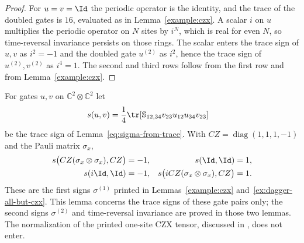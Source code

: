 \begin{proof}\leanok
    For $u=v=\Id$ the periodic operator is the identity, and the trace of the
    doubled gates is $16$, evaluated as in Lemma~\ref{example:czx}. A scalar
    $i$ on $u$ multiplies the periodic operator on $N$ sites by $i^N$, which
    is real for even $N$, so time-reversal invariance persists on those rings.
    The scalar enters the trace sign of $u,v$ as $i^2=-1$ and the doubled
    gate $u^{(2)}$ as $i^2$, hence the trace sign of $u^{(2)},v^{(2)}$ as
    $i^4=1$. The second and third rows follow from the first row and from
    Lemma~\ref{example:czx}.
\end{proof}

\begin{lemma}
    \label{thm:mpu_example_time_reversal_trace_signs}
    \leanok
    For gates $u,v$ on $\mathbb C^2\otimes\mathbb C^2$ let
    \begin{align}
        s(u,v) & =\frac14\tr\!\left[\mathbb S_{12,34}
            v_{23}u_{12}u_{34}v_{23}\right]
    \end{align}
    be the trace sign of Lemma~\ref{eq:sigma-from-trace}. With
    $CZ=\operatorname{diag}(1,1,1,-1)$ and the Pauli matrix $\sigma_x$,
    \begin{align}
        s\bigl(CZ(\sigma_x\otimes\sigma_x),CZ\bigr)  & =-1, &
        s(\Id,\Id)                                   & =1,    \\
        s(i\Id,\Id)                                  & =-1, &
        s\bigl(iCZ(\sigma_x\otimes\sigma_x),CZ\bigr) & =1.
    \end{align}
    These are the first signs $\sigma^{(1)}$ printed in
    Lemmas~\ref{example:czx} and~\ref{ex:dagger-all-but-czx}. This lemma
    concerns the trace signs of these gate pairs only; the second signs
    $\sigma^{(2)}$ and time-reversal invariance are proved in those two
    lemmas. The normalization of the printed one-site CZX tensor,
    discussed in \cite{gap:mpu_czx_tensor_normalization}, does not enter.
\end{lemma}

